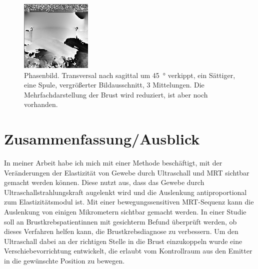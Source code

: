 \documentclass[
    11pt,
    ngerman
]{scrbook}
\begin{document}
\begin{figure}[htbp]
\begin{minipage}[htbp]{.45\textwidth}
        \includegraphics[width=.9\textwidth]{Abbildungen/2015-03-13_29_1.png}
        \caption{Phasenbild. Transversal nach sagittal um \SI{45}{\degree} verkippt, ein Sättiger, eine Spule, vergrößerter Bildausschnitt, 3 Mittelungen. Die Mehrfachdarstellung der Brust wird reduziert, ist aber noch vorhanden. \hspace{3cm} }
        \label{fig:2015-03-13_29_1}
    \end{minipage}
\end{figure}

    \chapter{Zusammenfassung/Ausblick}

    In meiner Arbeit habe ich mich mit einer Methode beschäftigt, mit der
    Veränderungen der Elastizität von Gewebe durch Ultraschall und MRT
    sichtbar gemacht werden können. Diese nutzt aus, dass das Gewebe durch
    Ultraschallstrahlungskraft augelenkt wird und die Auslenkung
    antiproportional zum Elastizitätsmodul ist. Mit einer bewegungssensitiven
    MRT-Sequenz kann die Auslenkung von einigen Mikrometern sichtbar gemacht
    werden. In einer Studie soll an Brustkrebspatientinnen mit gesichterm
    Befund überprüft werden, ob dieses Verfahren helfen kann, die
    Brustkrebsdiagnose zu verbessern. Um den Ultraschall dabei an der
    richtigen Stelle in die Brust einzukoppeln wurde eine
    Verschiebevorrichtung entwickelt, die erlaubt vom Kontrollraum aus den
    Emitter in die gewünschte Position zu bewegen.
\end{document}
